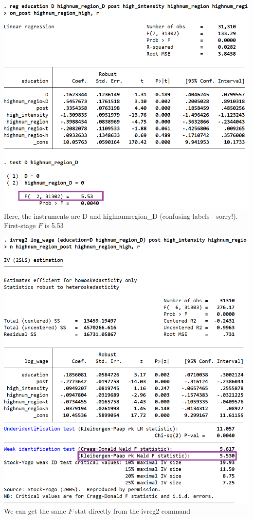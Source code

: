 \documentclass[11pt,english,handout]{beamer}
\begin{document}
\begin{frame}
	\includegraphics[width= 0.75\linewidth]{duflo_fs1.png}\\
	Here, the instruments are D and highnumregion\_D (confusing labels - sorry!). First-stage $F$ is 5.53
\end{frame}

\begin{frame}
	\includegraphics[width= 0.5\linewidth]{duflo_fs2.png}\\
	We can get the same $F$-stat directly from the ivreg2 command
\end{frame}
\end{document}

